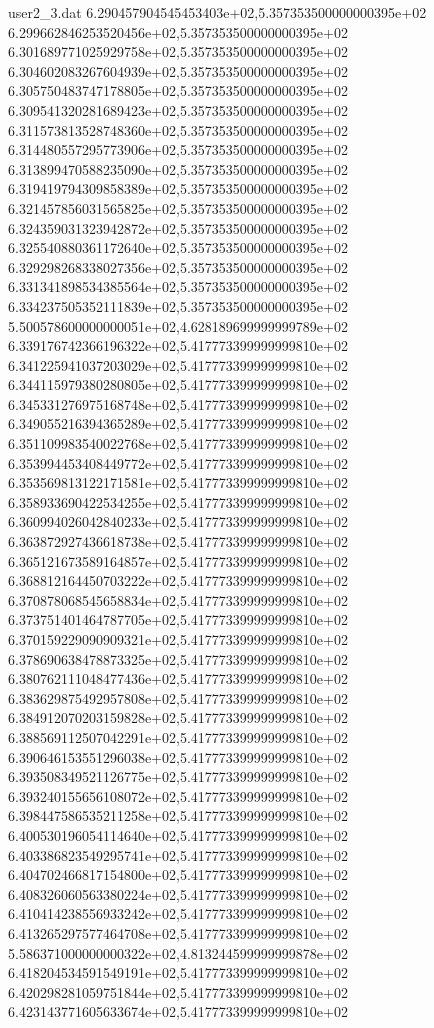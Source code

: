\begin{filecontents}{user2_3.dat}
6.290457904545453403e+02,5.357353500000000395e+02
6.299662846253520456e+02,5.357353500000000395e+02
6.301689771025929758e+02,5.357353500000000395e+02
6.304602083267604939e+02,5.357353500000000395e+02
6.305750483747178805e+02,5.357353500000000395e+02
6.309541320281689423e+02,5.357353500000000395e+02
6.311573813528748360e+02,5.357353500000000395e+02
6.314480557295773906e+02,5.357353500000000395e+02
6.313899470588235090e+02,5.357353500000000395e+02
6.319419794309858389e+02,5.357353500000000395e+02
6.321457856031565825e+02,5.357353500000000395e+02
6.324359031323942872e+02,5.357353500000000395e+02
6.325540880361172640e+02,5.357353500000000395e+02
6.329298268338027356e+02,5.357353500000000395e+02
6.331341898534385564e+02,5.357353500000000395e+02
6.334237505352111839e+02,5.357353500000000395e+02
5.500578600000000051e+02,4.628189699999999789e+02
6.339176742366196322e+02,5.417773399999999810e+02
6.341225941037203029e+02,5.417773399999999810e+02
6.344115979380280805e+02,5.417773399999999810e+02
6.345331276975168748e+02,5.417773399999999810e+02
6.349055216394365289e+02,5.417773399999999810e+02
6.351109983540022768e+02,5.417773399999999810e+02
6.353994453408449772e+02,5.417773399999999810e+02
6.353569813122171581e+02,5.417773399999999810e+02
6.358933690422534255e+02,5.417773399999999810e+02
6.360994026042840233e+02,5.417773399999999810e+02
6.363872927436618738e+02,5.417773399999999810e+02
6.365121673589164857e+02,5.417773399999999810e+02
6.368812164450703222e+02,5.417773399999999810e+02
6.370878068545658834e+02,5.417773399999999810e+02
6.373751401464787705e+02,5.417773399999999810e+02
6.370159229090909321e+02,5.417773399999999810e+02
6.378690638478873325e+02,5.417773399999999810e+02
6.380762111048477436e+02,5.417773399999999810e+02
6.383629875492957808e+02,5.417773399999999810e+02
6.384912070203159828e+02,5.417773399999999810e+02
6.388569112507042291e+02,5.417773399999999810e+02
6.390646153551296038e+02,5.417773399999999810e+02
6.393508349521126775e+02,5.417773399999999810e+02
6.393240155656108072e+02,5.417773399999999810e+02
6.398447586535211258e+02,5.417773399999999810e+02
6.400530196054114640e+02,5.417773399999999810e+02
6.403386823549295741e+02,5.417773399999999810e+02
6.404702466817154800e+02,5.417773399999999810e+02
6.408326060563380224e+02,5.417773399999999810e+02
6.410414238556933242e+02,5.417773399999999810e+02
6.413265297577464708e+02,5.417773399999999810e+02
5.586371000000000322e+02,4.813244599999999878e+02
6.418204534591549191e+02,5.417773399999999810e+02
6.420298281059751844e+02,5.417773399999999810e+02
6.423143771605633674e+02,5.417773399999999810e+02

\end{filecontents}
